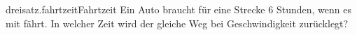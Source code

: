 \begin{exercise}{dreisatz.fahrtzeit}{Fahrtzeit}
  \ifproblem\problem
    Ein Auto braucht für eine Strecke 6 Stunden, wenn es mit  fährt.
    In welcher Zeit wird der gleiche Weg bei  Geschwindigkeit zurücklegt?
  \fi
\end{exercise}

